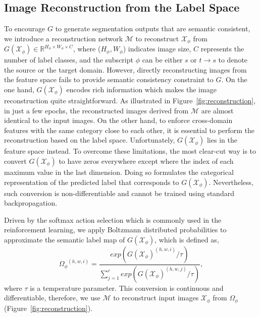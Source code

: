 \documentclass[runningheads]{llncs}
\begin{document}
	\subsection{Image Reconstruction from the Label Space}
	
	To encourage $ G $ to generate segmentation outputs that are semantic consistent, we introduce a reconstruction network $ \mathcal{M} $ to reconstruct $ \mathcal{X}_{\phi} $ from $ G(\mathcal{X}_{\phi}) \in \mathbb{R}^{H_{\phi} \times W_{\phi} \times C} $, where ($ H_{\phi}, W_{\phi} $) indicates image size, $ C $ represents the number of label classes, and the subscript $ \phi $ can be either $ s $ or $ t{\rightarrow}s $ to denote the source or the target domain. However, directly reconstructing images from the feature space fails to provide semantic consistency constraint to $ G $. On the one hand, $ G(\mathcal{X}_{\phi}) $ encodes rich information which makes the image reconstruction quite straightforward. As illustrated in Figure~\ref{fig:reconstruction}, in just a few epochs, the reconstructed images derived from $ \mathcal{M} $ are almost identical to the input images. On the other hand, to enforce cross-domain features with the same category close to each other, it is essential to perform the reconstruction based on the label space. Unfortunately, $ G(\mathcal{X}_{\phi}) $ lies in the feature space instead. To overcome these limitations, the most clear-cut way is to convert $ G(\mathcal{X}_{\phi}) $ to have zeros everywhere except where the index of each maximum value in the last dimension. Doing so formulates the categorical representation of the predicted label that corresponds to $ G(\mathcal{X}_{\phi}) $. Nevertheless, such conversion is non-differentiable and cannot be trained using standard backpropagation.
	
	
	Driven by the softmax action selection which is commonly used in the reinforcement learning, we apply Boltzmann distributed probabilities to approximate the semantic label map of $ G(\mathcal{X}_{\phi}) $, which is defined as,
	\begin{equation}
	{\Omega_{\phi}}^{(h, w, i)} = \frac{exp({G(\mathcal{X}_{\phi})}^{(h, w, i)} / \tau)}{\sum_{j=1}^{c} exp({G(\mathcal{X}_{\phi})}^{(h, w, j)} / \tau)},
	\end{equation}
	where $ \tau $ is a temperature parameter. This conversion is continuous and differentiable, therefore, we use $ \mathcal{M} $ to reconstruct input images $ \mathcal{X}_{\phi} $ from $ \Omega_{\phi} $ (Figure~\ref{fig:reconstruction}).
	
\end{document}
